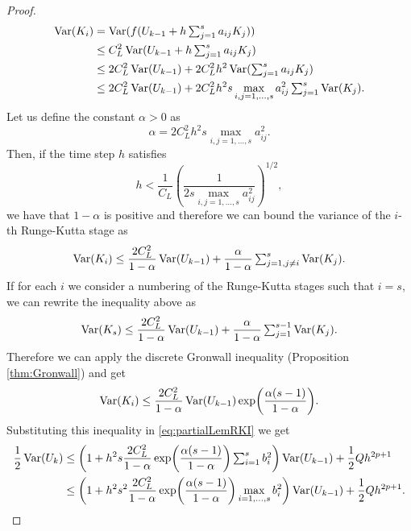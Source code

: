 \begin{proof}
\begin{equation}
\begin{aligned}
\operatorname{Var}(K_i) &= \operatorname{Var}(f(U_{k-1} + h\textstyle\sum_{j=1}^{s}a_{ij}K_j)) \\
&\leq C_L^2 \operatorname{Var}(U_{k-1} + h\textstyle\sum_{j=1}^{s}a_{ij}K_j) \\
&\leq 2C_L^2 \operatorname{Var}(U_{k-1}) + 2C_L^2h^2\operatorname{Var}(\textstyle\sum_{j=1}^{s}a_{ij}K_j)\\
&\leq 2C_L^2 \operatorname{Var}(U_{k-1}) + 2C_L^2h^2s\max_{i,j=1,\ldots,s}a_{ij}^2 \textstyle\sum_{j=1}^{s}\operatorname{Var}(K_j).
\end{aligned}
\end{equation}
Let us define the constant $\alpha > 0$ as
\begin{equation}
\alpha = 2C_L^2h^2s\max_{i,j=1,\ldots,s}a_{ij}^2.
\end{equation}
Then, if the time step $h$ satisfies
\begin{equation}
h < \frac{1}{C_L}\left(\frac{1}{2s\max_{i,j=1,\ldots,s}a_{ij}^2}\right)^{1/2},
\end{equation}
we have that $1 - \alpha$ is positive and therefore we can bound the variance of the $i$-th Runge-Kutta stage as
\begin{equation}
\operatorname{Var}(K_i) \leq \frac{2C_L^2}{1 - \alpha} \operatorname{Var}(U_{k-1}) + \frac{\alpha}{1-\alpha}\textstyle\sum_{j=1, j\neq i}^{s}\operatorname{Var}(K_j). 
\end{equation}
If for each $i$ we consider a numbering of the Runge-Kutta stages such that $i = s$, we can rewrite the inequality above as
\begin{equation}
\operatorname{Var}(K_s) \leq \frac{2C_L^2}{1 - \alpha} \operatorname{Var}(U_{k-1}) + \frac{\alpha}{1-\alpha}\textstyle\sum_{j=1}^{s-1}\operatorname{Var}(K_j).
\end{equation}
Therefore we can apply the discrete Gronwall inequality (Proposition \ref{thm:Gronwall}) and get
\begin{equation}
\operatorname{Var}(K_i) \leq \frac{2C_L^2}{1 - \alpha} \operatorname{Var}(U_{k-1})\exp(\frac{\alpha(s-1)}{1-\alpha}).
\end{equation}
Substituting this inequality in \eqref{eq:partialLemRKI} we get
\begin{equation}
\begin{aligned}
\frac{1}{2}\Var(U_k) &\leq \left(1 + h^2s\frac{2C_L^2}{1 - \alpha}\exp(\frac{\alpha(s-1)}{1-\alpha})\sksum_{i=1}^s b_i^2\right)\Var(U_{k-1}) + \frac{1}{2}Q h^{2p+1} \\
&\leq \left(1 + h^2s^2\frac{2C_L^2}{1 - \alpha}\exp(\frac{\alpha(s-1)}{1-\alpha})\max_{i=1,\ldots,s} b_i^2\right)\Var(U_{k-1}) + \frac{1}{2}Q h^{2p+1}.
\end{aligned}

\end{equation}
\end{proof}
